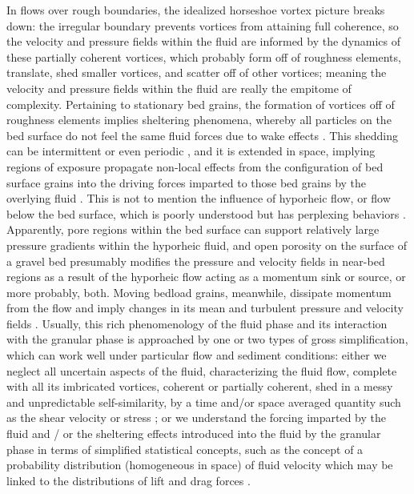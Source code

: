 \documentclass{article}
\begin{document}
{In flows over rough boundaries, the idealized horseshoe vortex picture breaks down: the irregular boundary prevents vortices from attaining full coherence, so the velocity and pressure fields within the fluid are informed by the dynamics of these partially coherent vortices, which probably form off of roughness elements, translate, shed smaller vortices, and scatter off of other vortices; meaning the velocity and pressure fields within the fluid are really the empitome of complexity.
Pertaining to stationary bed grains, the formation of vortices off of roughness elements implies sheltering phenomena, whereby all particles on the bed surface do not feel the same fluid forces due to wake effects \citep{Egiazoff1965, AnnaM2017}. 
This shedding can be intermittent or even periodic \citep{}, and it is extended in space, implying regions of exposure propagate non-local effects from the configuration of bed surface grains into the driving forces imparted to those bed grains by the overlying fluid \citep{McEwan2004}. 
This is not to mention the influence of hyporheic flow, or flow below the bed surface, which is poorly understood but has perplexing behaviors \citep{Cooper2017}.  
Apparently, pore regions within the bed surface can support relatively large pressure gradients within the hyporheic fluid, and open porosity on the surface of a gravel bed presumably modifies the pressure and velocity fields in near-bed regions as a result of the hyporheic flow acting as a momentum sink or source, or more probably, both. 
Moving bedload grains, meanwhile, dissipate momentum from the flow and imply changes in its mean and turbulent pressure and velocity fields \citep{Singh2010, Santos2014, Liu2016}. 
Usually, this rich phenomenology of the fluid phase and its interaction with the granular phase is approached by one or two types of gross simplification, which can work well under particular flow and sediment conditions: either we neglect all uncertain aspects of the fluid, characterizing the fluid flow, complete with all its imbricated vortices, coherent or partially coherent, shed in a messy and unpredictable self-similarity, by a time and/or space averaged quantity such as the shear velocity or stress \citep{Yalin1972, Stelczer1983}; or we understand the forcing imparted by the fluid and / or the sheltering effects introduced into the fluid by the granular phase in terms of simplified statistical concepts, such as the concept of a probability distribution (homogeneous in space) of fluid velocity \citep{Einstein1950, Paintal1971} which may be linked to the distributions of lift and drag forces \citep{Hofland2006, Schmeeckle2007}. 

}
\end{document}
